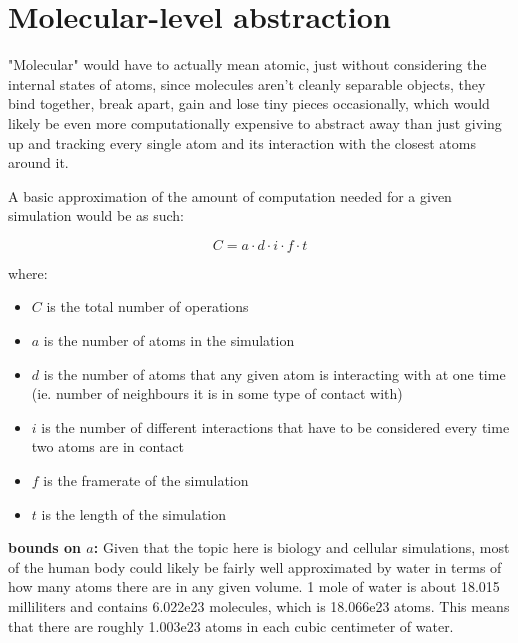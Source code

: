 \documentclass[a4paper]{article}
\begin{document}
	\pagebreak
	
	\section{Molecular-level abstraction}
	
	"Molecular" would have to actually mean atomic, just without considering the internal states of atoms, since molecules aren't cleanly separable objects, they bind together, break apart, gain and lose tiny pieces occasionally, which would likely be even more computationally expensive to abstract away than just giving up and tracking every single atom and its interaction with the closest atoms around it.
	
	\medskip
	
	\noindent A basic approximation of the amount of computation needed for a given simulation would be as such:
	
	$$ C = a \cdot d \cdot i \cdot f \cdot t$$
	
	where:
	
	\begin{itemize}
		\item $C$ is the total number of operations
		
		\item $a$ is the number of atoms in the simulation
		
		\item $d$ is the number of atoms that any given atom is interacting with at one time (ie. number of neighbours it is in some type of contact with)
		
		\item $i$ is the number of different interactions that have to be considered every time two atoms are in contact
		
		\item $f$ is the framerate of the simulation
		
		\item $t$ is the length of the simulation
	\end{itemize}
	
	\textbf{bounds on $a$:} Given that the topic here is biology and cellular simulations, most of the human body could likely be fairly well approximated by water in terms of how many atoms there are in any given volume. 1 mole of water is about 18.015 milliliters and contains 6.022e23 molecules, which is 18.066e23 atoms. This means that there are roughly 1.003e23 atoms in each cubic centimeter of water.
	
	\medskip
	
\end{document}
